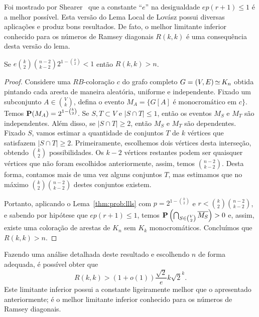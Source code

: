 Foi mostrado por Shearer~\cite{shearer1985problem} que a constante ``$e$'' na desigualdade $ep(r+1) \leq 1$ é a melhor possível. Esta versão do Lema Local de Lovász possui diversas aplicações e produz bons resultados. De fato, o melhor limitante inferior conhecido para os números de Ramsey diagonais $R(k,k)$ é uma consequência desta versão do lema.

\begin{theorem}
\label{thm:prob:ramseylll}
Se $\displaystyle e \binom{k}{2}\binom{n-2}{k-2} 2^{1 - \binom{k}{2}} < 1$ então $R(k,k) > n$.
\end{theorem}
\begin{proof}
Considere uma $RB$-coloração $c$ do grafo completo $G = (V,E) \operatorname{\simeq} K_n$ obtida pintando cada aresta de maneira aleatória, uniforme e independente. Fixado um subconjunto $A \in \binom{V}{k}$, defina o evento $M_A = \{G[A] \text{ é monocromático em } c\}$. Temos $\operatorname{\mathbf{P}}(M_A) = 2^{1- \binom{k}{2}}$. Se $S, T \subset V$ e $|S \cap T| \leq 1$, então os eventos $M_S$ e $M_T$ são independentes.
Além disso, se $|S \cap T| \geq 2$, então $M_S$ e $M_T$ são dependentes. Fixado $S$, vamos estimar a quantidade de conjuntos $T$ de $k$ vértices que satisfazem $|S \cap T| \geq 2$. Primeiramente, escolhemos dois vértices desta interseção, obtendo $\binom{k}{2}$ possibilidades. Os $k-2$ vértices restantes podem ser quaisquer vértices que não foram escolhidos anteriormente, assim, temos $\binom{n-2}{k-2}$. Desta forma, contamos mais de uma vez alguns conjuntos $T$, mas estimamos que no máximo $\binom{k}{2}\binom{n-2}{k-2}$ destes conjuntos existem.

Portanto, aplicando o Lema~\ref{thm:prob:llls} com $p = 2^{1 - \binom{k}{2}}$ e $r < \binom{k}{2}\binom{n-2}{k-2}$, e sabendo por hipótese que $ep(r+1) \leq 1$,
temos $\operatorname{\mathbf{P}} \left( \bigcap_{S \in \binom{V}{2}} \overline{M_S} \right) > 0$ e, assim, existe uma coloração de arestas de $K_n$ sem $K_k$ monocromáticos. Concluímos que $R(k,k) > n$.
\end{proof}

Fazendo uma análise detalhada deste resultado e escolhendo $n$ de forma adequada, é possível obter que
\[R(k,k) > (1+o(1))\frac{\sqrt{2}}{e}k\sqrt{2}^k.\]
Este limitante inferior possui a constante ligeiramente melhor que o apresentado anteriormente; é o melhor limitante inferior conhecido para os números de Ramsey diagonais.

